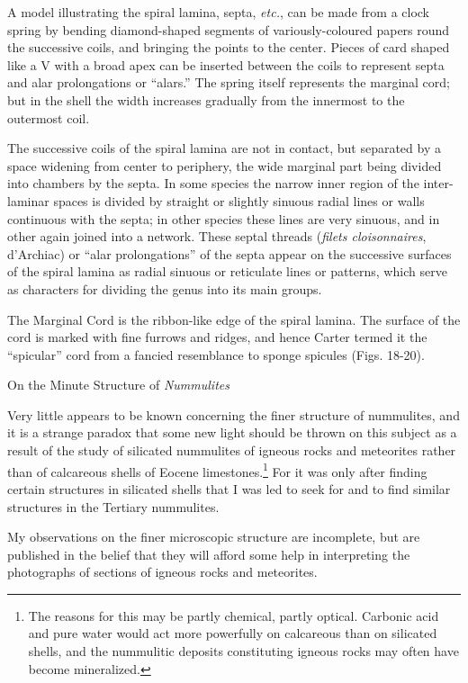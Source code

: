 \documentclass[a4paper, 12pt, oneside]{article}
\begin{document}
A model illustrating the spiral lamina, septa, \emph{etc.}, can be made from a clock spring by bending diamond-shaped segments of variously-coloured papers round the successive coils, and bringing the points to the center. Pieces of card shaped like a V with a broad apex can be inserted between the coils to represent septa and alar prolongations or ``alars.'' The spring itself represents the marginal cord; but in the shell the width increases gradually from the innermost to the outermost coil.

The successive coils of the spiral lamina are not in contact, but separated by a space widening from center to periphery, the wide marginal part being divided into chambers by the septa. In some species the narrow inner region of the inter-laminar spaces is divided by straight or slightly sinuous radial lines or walls continuous with the septa; in other species these lines are very sinuous, and in other again joined into a network. These septal threads (\emph{filets cloisonnaires}, d'Archiac) or ``alar prolongations'' of the septa appear on the successive surfaces of the spiral lamina as radial sinuous or reticulate lines or patterns, which serve as characters for dividing the genus into its main groups.

The Marginal Cord is the ribbon-like edge of the spiral lamina. The surface of the cord is marked with fine furrows and ridges, and hence Carter termed it the ``spicular'' cord from a fancied resemblance to sponge spicules (Figs. 18-20).

On the Minute Structure of \emph{Nummulites}

Very little appears to be known concerning the finer structure of nummulites, and it is a strange paradox that some new light should be thrown on this subject as a result of the study of silicated nummulites of igneous rocks and meteorites rather than of calcareous shells of Eocene limestones.\footnote{The reasons for this may be partly chemical, partly optical. Carbonic acid and pure water would act more powerfully on calcareous than on silicated shells, and the nummulitic deposits constituting igneous rocks may often have become mineralized.} For it was only after finding certain structures in silicated shells that I was led to seek for and to find similar structures in the Tertiary nummulites.

My observations on the finer microscopic structure are incomplete, but are published in the belief that they will afford some help in interpreting the photographs of sections of igneous rocks and meteorites.
\end{document}
